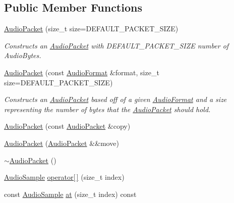 \subsection*{Public Member Functions}
\begin{DoxyCompactItemize}
\item 
\hyperlink{class_d_x_1_1_audio_1_1_audio_packet_a1086b8c3a23adbddf3dfa5706f0f7b04}{Audio\-Packet} (size\-\_\-t size=D\-E\-F\-A\-U\-L\-T\-\_\-\-P\-A\-C\-K\-E\-T\-\_\-\-S\-I\-Z\-E)
\begin{DoxyCompactList}\small\item\em Constructs an \hyperlink{class_d_x_1_1_audio_1_1_audio_packet}{Audio\-Packet} with D\-E\-F\-A\-U\-L\-T\-\_\-\-P\-A\-C\-K\-E\-T\-\_\-\-S\-I\-Z\-E number of Audio\-Bytes. \end{DoxyCompactList}\item 
\hyperlink{class_d_x_1_1_audio_1_1_audio_packet_a14c8e9755e1ac8bb386c1a8a62dd6058}{Audio\-Packet} (const \hyperlink{struct_d_x_1_1_audio_1_1_audio_format}{Audio\-Format} \&format, size\-\_\-t size=D\-E\-F\-A\-U\-L\-T\-\_\-\-P\-A\-C\-K\-E\-T\-\_\-\-S\-I\-Z\-E)
\begin{DoxyCompactList}\small\item\em Constructs an \hyperlink{class_d_x_1_1_audio_1_1_audio_packet}{Audio\-Packet} based off of a given \hyperlink{struct_d_x_1_1_audio_1_1_audio_format}{Audio\-Format} and a size representing the number of bytes that the \hyperlink{class_d_x_1_1_audio_1_1_audio_packet}{Audio\-Packet} should hold. \end{DoxyCompactList}\item 
\hyperlink{class_d_x_1_1_audio_1_1_audio_packet_a31534a4d2d2e8e10f95bf256055418f6}{Audio\-Packet} (const \hyperlink{class_d_x_1_1_audio_1_1_audio_packet}{Audio\-Packet} \&copy)
\item 
\hyperlink{class_d_x_1_1_audio_1_1_audio_packet_ac0554258f103fc1f9a21fdf90d6405fb}{Audio\-Packet} (\hyperlink{class_d_x_1_1_audio_1_1_audio_packet}{Audio\-Packet} \&\&move)
\item 
\hyperlink{class_d_x_1_1_audio_1_1_audio_packet_a0ef397ec1f3cbc296a5e06ffe9051f60}{$\sim$\-Audio\-Packet} ()
\item 
\hyperlink{class_d_x_1_1_audio_1_1_audio_sample}{Audio\-Sample} \hyperlink{class_d_x_1_1_audio_1_1_audio_packet_aaedb59240e8d6b8f77266fcd23ed9ab1}{operator\mbox{[}$\,$\mbox{]}} (size\-\_\-t index)
\item 
const \hyperlink{class_d_x_1_1_audio_1_1_audio_sample}{Audio\-Sample} \hyperlink{class_d_x_1_1_audio_1_1_audio_packet_a279dcbea3ad12838ceb819ab9639362e}{at} (size\-\_\-t index) const 

\end{DoxyCompactItemize}
